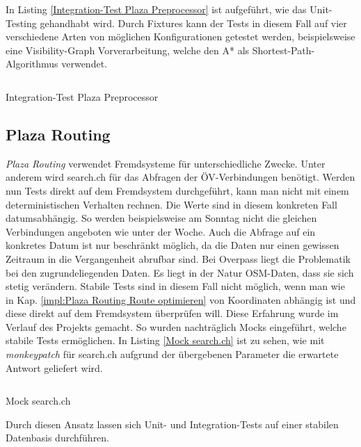 In Listing \ref{Integration-Test Plaza Preprocessor} ist aufgeführt, wie das Unit-Testing gehandhabt wird. Durch Fixtures kann der Tests in diesem Fall auf vier verschiedene Arten von möglichen Konfigurationen getestet werden, beispielsweise eine Visibility-Graph Vorverarbeitung, welche den A* \cite{astar} als Shortest-Path-Algorithmus verwendet.

\begin{listing}[ht]
    \inputminted{python}{projectdoc/listing/test_plaza_prepreprocessor.py}
    \caption{Integration-Test Plaza Preprocessor}
    \label{Integration-Test Plaza Preprocessor}
\end{listing}

\subsection{Plaza Routing}
\label{test:Plaza Routing}

\emph{Plaza Routing} verwendet Fremdsysteme für unterschiedliche Zwecke. Unter anderem wird search.ch \cite{search_ch_route_api} für das Abfragen der ÖV-Verbindungen benötigt. Werden nun Tests direkt auf dem Fremdsystem durchgeführt, kann man nicht mit einem deterministischen Verhalten rechnen. Die Werte sind in diesem konkreten Fall datumsabhängig. So werden beispielsweise am Sonntag nicht die gleichen Verbindungen angeboten wie unter der Woche. Auch die Abfrage auf ein konkretes Datum ist nur beschränkt möglich, da die Daten nur einen gewissen Zeitraum in die Vergangenheit abrufbar sind. Bei Overpass \cite{wiki:overpass} liegt die Problematik bei den zugrundeliegenden Daten. Es liegt in der Natur \ac{OSM}-Daten, dass sie sich stetig verändern. Stabile Tests sind in diesem Fall nicht möglich, wenn man wie in Kap. \ref{impl:Plaza Routing Route optimieren} von Koordinaten abhängig ist und diese direkt auf dem Fremdsystem überprüfen will. Diese Erfahrung wurde im Verlauf des Projekts gemacht. So wurden nachträglich Mocks eingeführt, welche stabile Tests ermöglichen. In Listing \ref{Mock search.ch} ist zu sehen, wie mit \emph{monkeypatch} \cite{pytest} für search.ch \cite{search_ch_route_api} aufgrund der übergebenen Parameter die erwartete Antwort geliefert wird. 

\begin{listing}[ht]
    \inputminted{python}{projectdoc/listing/mock_search_ch.py}
    \caption{Mock search.ch}
    \label{Mock search.ch}
\end{listing}

Durch diesen Ansatz lassen sich Unit- und Integration-Tests auf einer stabilen Datenbasis durchführen.

